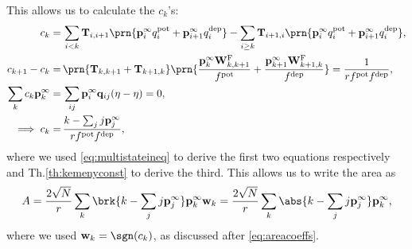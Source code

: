 \documentclass{article} %
\newcommand{\pr}{\mathbf{p}}
\newcommand{\eq}{\pr^\infty}
\newcommand{\fpt}{\mathbf{T}}
\newcommand{\w}{\mathbf{w}}
\newcommand{\W}{\mathbf{W}}
\newcommand{\enc}{\mathbf{q}}
\newcommand{\frg}{\W^{\mathrm{F}}}
\newcommand{\pot}{^{\text{pot}}}
\newcommand{\dep}{^{\text{dep}}}
\begin{document}
This allows us to calculate the $c_k$'s:
%
\begin{equation}\label{eq:areacoeffchain}
\begin{aligned}
  c_k =&\, \sum_{i<k} \fpt_{i,i+1} \prn{\eq_{i}q\pot _i+\eq_{i+1}q\dep _i}
    - \sum_{i\geq k} \fpt_{i+1,i} \prn{\eq_{i}q\pot _i+\eq_{i+1}q\dep _i}
  ,\\
  c_{k+1} - c_k =&\, \prn{\fpt_{k,k+1}+\fpt_{k+1,k}} \prn{\frac{\eq_{k}\frg_{k,k+1}}{f\pot }+\frac{\eq_{k+1}\frg_{k+1,k}}{f\dep }}
    =%
    \frac{1}{rf\pot f\dep },\\
  \sum_k c_k \eq_k =&\, \sum_{ij} \eq_i \enc_{ij} (\eta-\eta) = 0,\\
  \implies c_k =&\, \frac{k - \sum_j j\eq_j}{rf\pot f\dep },
\end{aligned}
\end{equation}
%
where we used \eqref{eq:multistateineq} to derive the first two equations respectively and Th.\ref{th:kemenyconst} to derive the third. This allows us to write the area as
%
\begin{equation}\label{eq:multistatearea}
  A = \frac{2\sqrt{N}}{r} \sum_k \brk{k - \sum_j j\eq_j} \eq_k \w_k
    = \frac{2\sqrt{N}}{r} \sum_k \abs{k - \sum_j j\eq_j} \eq_k ,
\end{equation}
%
where we used $\w_k=\sgn(c_k)$, as discussed after \eqref{eq:areacoeffs}.
%
\end{document}
